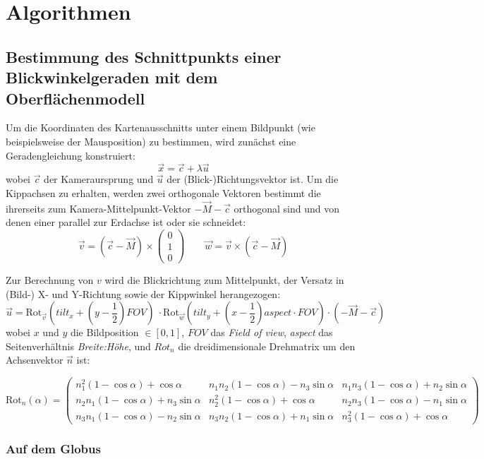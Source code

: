 \documentclass[10pt]{scrreprt}
\begin{document}
\chapter{Algorithmen}

\section{Bestimmung des Schnittpunkts einer Blickwinkelgeraden mit dem Oberflächenmodell}
Um die Koordinaten des Kartenausschnitts unter einem Bildpunkt (wie beispielsweise der Mausposition) zu bestimmen, wird zunächst eine Geradengleichung konstruiert:
\[\vec{x} = \vec{c}+\lambda\vec{u}\]
wobei $\vec{c}$ der Kameraursprung und $\vec{u}$ der (Blick-)Richtungsvektor ist. Um die Kippachsen zu erhalten, werden zwei orthogonale Vektoren bestimmt die ihrerseits zum Kamera-Mittelpunkt-Vektor $-\vec{M}-\vec{c}$ orthogonal sind und von denen einer parallel zur Erdachse ist oder sie schneidet:
\[\vec{v} = (\vec{c}-\vec{M})\times\left(\begin{array}{c}0\\1\\0\end{array}\right)\qquad \vec{w} = \vec{v}\times (\vec{c}-\vec{M})\]


Zur Berechnung von $v$ wird die Blickrichtung zum Mittelpunkt, der Versatz in (Bild-) X- und Y-Richtung sowie der Kippwinkel herangezogen:
\[\vec{u}=\mathrm{Rot}_{\vec{v}}\left(tilt_x+\left(y-\frac{1}{2}\right)FOV\right)\ \cdot \mathrm{Rot}_{\vec{w}}\left(tilt_y+\left(x-\frac{1}{2}\right)aspect\cdot FOV\right)\cdot (-\vec{M}-\vec{c})\]
wobei $x$ und $y$ die Bildposition $\in [0, 1]$, $FOV$ das \textit{Field of view}, \textit{aspect} das Seitenverhältnis \textit{Breite:Höhe}, und $Rot_n$ die dreidimensionale Drehmatrix um den Achsenvektor $\vec{n}$ ist:

\[\mathrm{Rot}_n(\alpha) = 
\begin{pmatrix}
n_1^2(1-\cos\alpha)+\cos\alpha	& 	n_1n_2(1-\cos\alpha)-n_3\sin\alpha	& 	n_1n_3(1-\cos\alpha)+n_2\sin\alpha\\
n_2n_1(1-\cos\alpha)+n_3\sin\alpha	& 	n_2^2(1-\cos\alpha)+\cos\alpha	& 	n_2n_3(1-\cos\alpha)-n_1\sin\alpha\\
n_3n_1(1-\cos\alpha)-n_2\sin\alpha	& 	n_3n_2(1-\cos\alpha)+n_1\sin\alpha	&	n_3^2(1-\cos\alpha)+\cos\alpha
\end{pmatrix}\]

\subsection{Auf dem Globus}
\end{document}
